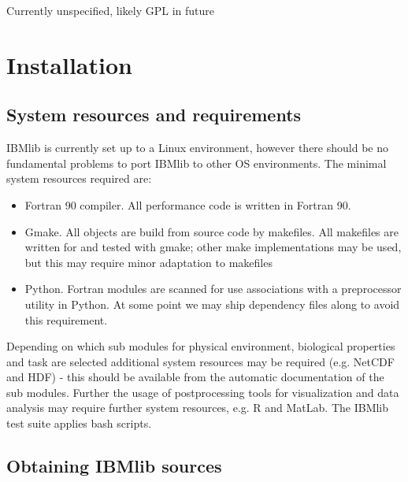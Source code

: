 Currently unspecified, likely GPL in future

\chapter{Installation}

\section{System resources and requirements}

IBMlib is currently set up to a Linux environment, however
there should be no fundamental problems to port IBMlib to
other OS environments.
The minimal system resources required are:
\begin{itemize}
  \item Fortran 90 compiler. All performance code is written in Fortran 90.
  \item Gmake. All objects are build from source code by makefiles.
        All makefiles are written for and tested with gmake; other
        make implementations may be used, but this may require 
        minor adaptation to makefiles  
  \item Python. Fortran modules are scanned for use associations with a 
        preprocessor utility in Python. At some point we may ship 
        dependency files along to avoid this requirement.

\end{itemize}
Depending on which sub modules for physical environment, biological
properties and task  are selected additional system resources
may be required (e.g. NetCDF and HDF) - this should be available from the 
automatic documentation of the sub modules. Further the usage of 
postprocessing tools for visualization and data analysis may require 
further system resources, e.g. R and MatLab. The IBMlib test suite applies
bash scripts.

\section{Obtaining IBMlib sources} 

